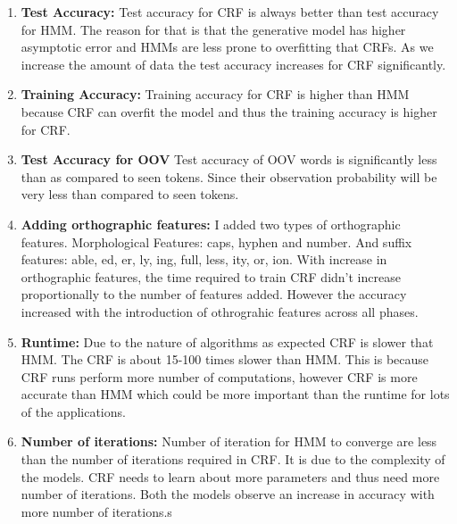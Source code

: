 \documentclass[10pt] {article}
\begin{document}
\begin{enumerate}
\item {\bf {Test Accuracy:}} Test accuracy for CRF is always better than test accuracy for HMM. The reason for that is that the generative model has higher asymptotic error and HMMs are less prone to overfitting that CRFs. As we increase the amount of data the test accuracy increases for CRF significantly. 
\item {\bf{Training Accuracy:}} Training accuracy for CRF is higher than HMM because CRF can overfit the model and thus the training accuracy is higher for CRF.
\item {\bf{Test Accuracy for OOV}} Test accuracy of OOV words is significantly less than as compared to seen tokens. Since their observation probability will be very less than compared to seen tokens. 
\item {\bf Adding orthographic features:} I added two types of orthographic features. Morphological Features: caps, hyphen and number. And suffix features: able, ed, er, ly, ing, full, less, ity, or, ion.
With increase in orthographic features, the time required to train CRF didn't increase proportionally to the number of features added. However the accuracy increased with the introduction of othrograhic features across all phases. 
\item {\bf {Runtime:} } Due to the nature of algorithms as expected CRF is slower that HMM. The CRF is about 15-100 times slower than HMM. This is because CRF runs perform more number of computations, however CRF is more accurate than HMM which could be more important than the runtime for lots of the applications.
\item {\bf Number of iterations: } Number of iteration for HMM to converge are less than the number of iterations required in CRF. It is due to the complexity of the models. CRF needs to learn about more parameters and thus need more number of iterations. Both the models observe an increase in accuracy with more number of iterations.s

\end{enumerate}
\end{document}
